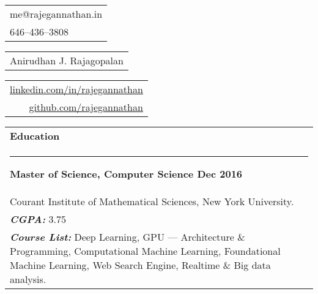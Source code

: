 \documentclass{article}
\begin{document}
{\small\begin{tabular}[c]{l}
        me@rajegannathan.in \\
        646--436--3808
\end{tabular}}\hfill%
{\Large\bfseries\begin{tabular}[c]{c}
        Anirudhan J. Rajagopalan
\end{tabular}}\hfill%
{\small\begin{tabular}[c]{r}
        \href{https://linkedin.com/in/rajegannathan}{linkedin.com/in/rajegannathan} \\
        \href{https://github.com/rajegannathan}{github.com/rajegannathan}
\end{tabular}}%


\bigskip

\begin{tabular}{p{\dimexpr\linewidth-2\tabcolsep}}
    \textbf{\large{Education}} \\
    \noindent\rule{\textwidth}{0.4pt}
    {\bfseries Master of Science, Computer Science \hfill Dec 2016} \\
    \quad Courant Institute of Mathematical Sciences, New York University.\\
    \quad \textbf{\textit{CGPA:}} 3.75 \\
    \quad \textbf{\textit{Course List:}} Deep Learning, GPU --- Architecture \& Programming, Computational Machine Learning, Foundational Machine Learning, Web Search Engine, Realtime \& Big data analysis.
\end{tabular}

\bigskip
\end{document}
